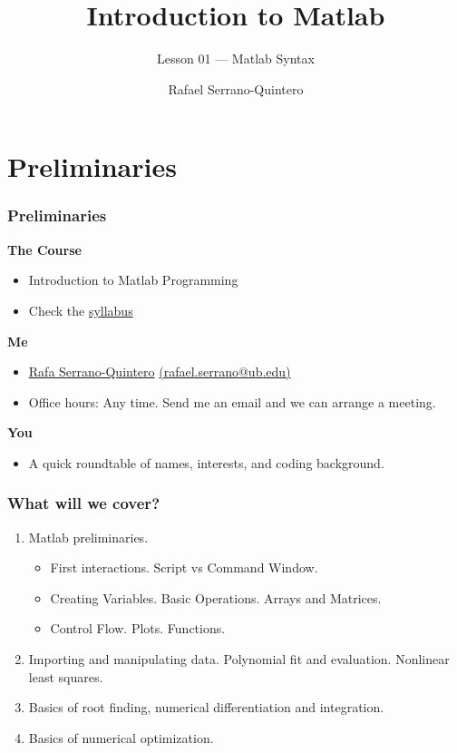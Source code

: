 \documentclass[11pt,xcolor={svgnames},aspectratio=169,usepdftitle=false]{beamer}
\title{Introduction to Matlab}
\subtitle{Lesson 01 --- Matlab Syntax}
\author{Rafael Serrano-Quintero}
\institute{Department of Economics \\ University of Barcelona}
\date{}
\begin{document}
\VerbatimFootnotes

\maketitle

\section{Preliminaries}

\begin{frame}
    \frametitle{Preliminaries}
    \textbf{\alert{The Course}}
    \begin{itemize}
        \item Introduction to Matlab Programming
        \item Check the \href{run:../syllabus/syllabus.pdf}{syllabus}
    \end{itemize}
    \textbf{\alert{Me}}
    \begin{itemize}
        \item \href{rafserqui.github.io}{Rafa Serrano-Quintero} \href{mailto:rafael.serrano@ub.edu}{(rafael.serrano@ub.edu)}
        \item Office hours: Any time. Send me an email and we can arrange a meeting.
    \end{itemize}
    \textbf{\alert{You}}
    \begin{itemize}
        \item A quick roundtable of names, interests, and coding background.
    \end{itemize}
\end{frame}

\begin{frame}
    \frametitle{What will we cover?}
    \begin{enumerate}
        \item Matlab preliminaries. 
            \begin{itemize}
                \item First interactions. Script vs Command Window.
                \item Creating Variables. Basic Operations. Arrays and Matrices.
                \item Control Flow. Plots. Functions.
            \end{itemize}
        \item Importing and manipulating data. Polynomial fit and evaluation. Nonlinear least squares.
        \item Basics of root finding, numerical differentiation and integration.
        \item Basics of numerical optimization.
    \end{enumerate}
\end{frame}
\end{document}
